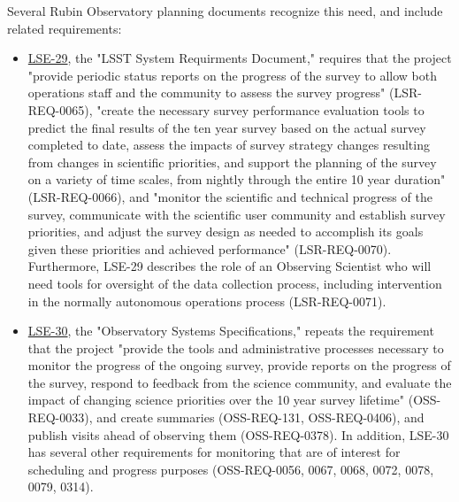 Several Rubin Observatory planning documents recognize this need, and include related requirements:
\begin{itemize}
\item \href{https://ls.st/lse-29}{LSE-29}, the "LSST System Requirments Document," requires that the project "provide periodic status reports on the progress of the survey to allow both operations staff and the community to assess the survey progress" (LSR-REQ-0065), "create the necessary survey performance evaluation tools to predict the final results of the ten year survey based on the actual survey completed to date, assess the impacts of survey strategy changes resulting from changes in scientific priorities, and support the planning of the survey on a variety of time scales, from nightly through the entire 10 year duration" (LSR-REQ-0066), and "monitor the scientific and technical progress of the survey, communicate with the scientific user community and establish survey priorities, and adjust the survey design as needed to accomplish its goals given these priorities and achieved performance" (LSR-REQ-0070). Furthermore, LSE-29 describes the role of an Observing Scientist who will need tools for oversight of the data collection process, including intervention in the normally autonomous operations process (LSR-REQ-0071).
\item \href{https://ls.st/lse-30}{LSE-30}, the "Observatory Systems Specifications," repeats the requirement that the project "provide the tools and administrative processes necessary to monitor the progress of the ongoing survey, provide reports on the progress of the survey, respond to feedback from the science community, and evaluate the impact of changing science priorities over the 10 year survey lifetime" (OSS-REQ-0033), and create summaries (OSS-REQ-131, OSS-REQ-0406), and publish visits ahead of observing them (OSS-REQ-0378). In addition, LSE-30 has several other requirements for monitoring that are of interest for scheduling and progress purposes (OSS-REQ-0056, 0067, 0068, 0072, 0078, 0079, 0314).

\end{itemize}
